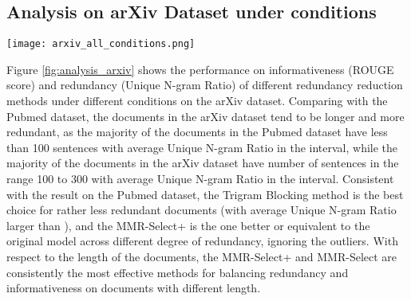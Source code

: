 \documentclass[11pt,a4paper]{article}
\begin{document}
\subsection{Analysis on arXiv Dataset under conditions}
\begin{figure*}[htb!]
    \centering
\texttt{[image: arxiv\_all\_conditions.png]}
    \caption{Comparing the average ROUGE scores and average unique n-gram ratios of different models on the arXiv dataset, conditioned on different degrees of redundancy and lengths of the document.\footnotemark}
    \label{fig:analysis_arxiv}
\end{figure*}
Figure \ref{fig:analysis_arxiv} shows the performance on informativeness (ROUGE score) and redundancy (Unique N-gram Ratio) of different redundancy reduction methods under different conditions on the arXiv dataset. Comparing with the Pubmed dataset, the documents in the arXiv dataset tend to be longer and more redundant, as the majority of the documents in the Pubmed dataset have less than 100 sentences with average Unique N-gram Ratio in the  interval, while the majority of the documents in the arXiv dataset have number of sentences in the range 100 to 300 with average Unique N-gram Ratio in the  interval. Consistent with the result on the Pubmed dataset, the Trigram Blocking method is the best choice for rather less redundant documents (with average Unique N-gram Ratio larger than ), and the MMR-Select+ is the one better or equivalent to the original model across different degree of redundancy, ignoring the outliers. With respect to the length of the documents, the MMR-Select+ and MMR-Select are consistently the most effective methods for balancing redundancy and informativeness on documents with different length.
\end{document}
